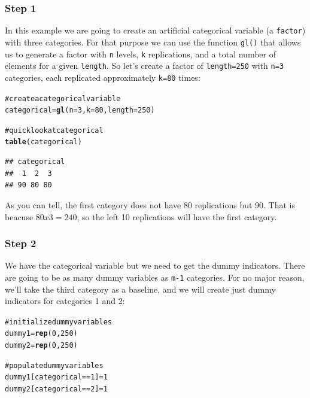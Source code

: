 \documentclass[12pt]{book}\usepackage{graphicx, color}
\makeatletter
\newcommand{\hlfunctioncall}[1]{\textcolor[rgb]{0.501960784313725,0,0.329411764705882}{\textbf{#1}}}%
\newcommand{\hlcomment}[1]{\textcolor[rgb]{0.180392156862745,0.6,0.341176470588235}{#1}}%
\newenvironment{kframe}{%
 \def\at@end@of@kframe{}%
 \ifinner\ifhmode%
  \def\at@end@of@kframe{\end{minipage}}%
  \begin{minipage}{\columnwidth}%
 \fi\fi%
 \def\FrameCommand##1{\hskip\@totalleftmargin \hskip-\fboxsep
 \colorbox{shadecolor}{##1}\hskip-\fboxsep
     \hskip-\linewidth \hskip-\@totalleftmargin \hskip\columnwidth}%
 \MakeFramed {\advance\hsize-\width
   \@totalleftmargin\z@ \linewidth\hsize
   \@setminipage}}%
 {\par\unskip\endMakeFramed%
 \at@end@of@kframe}
\newenvironment{knitrout}{}{} %
\newcommand{\code}[1]{\texttt{#1}}
\makeatother
\begin{document}
\subsubsection*{Step 1}
In this example we are going to create an artificial categorical variable (a \code{factor}) with three categories. For that purpose we can use the function \code{gl()} that allows us to generate a factor with \code{n} levels, \code{k} replications, and a total number of elements for a given \code{length}. So let's create a factor of \code{length=250} with \code{n=3} categories, each replicated approximately \code{k=80} times:
\begin{knitrout}
\color{fgcolor}\begin{kframe}
\begin{alltt}
\hlcomment{# create a categorical variable}
categorical = \hlfunctioncall{gl}(n = 3, k = 80, length = 250)

\hlcomment{# quick look at categorical}
\hlfunctioncall{table}(categorical)
\end{alltt}
\begin{verbatim}
## categorical
##  1  2  3 
## 90 80 80
\end{verbatim}
\end{kframe}
\end{knitrout}

As you can tell, the first category does not have 80 replications but 90. That is beacuse $80 x 3 = 240$, so the left 10 replications will have the first category.

\subsubsection*{Step 2}
We have the categorical variable but we need to get the dummy indicators. There are going to be as many dummy variables as \code{m-1} categories. For no major reason, we'll take the third category as a baseline, and we will create just dummy indicators for categories 1 and 2:
\begin{knitrout}
\color{fgcolor}\begin{kframe}
\begin{alltt}
\hlcomment{# initialize dummy variables}
dummy1 = \hlfunctioncall{rep}(0, 250)
dummy2 = \hlfunctioncall{rep}(0, 250)

\hlcomment{# populate dummy variables}
dummy1[categorical == 1] = 1
dummy2[categorical == 2] = 1
\end{alltt}
\end{kframe}
\end{knitrout}
\end{document}
